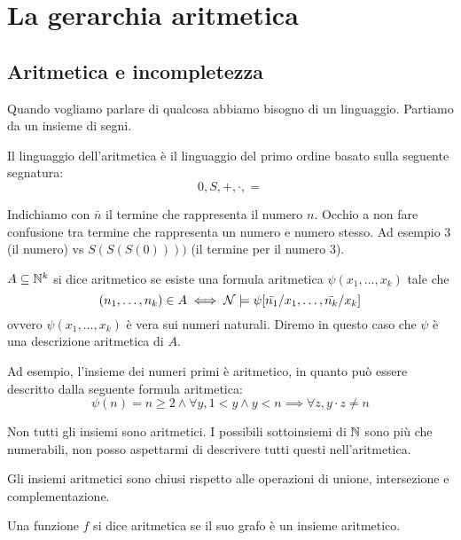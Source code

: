 \chapter{La gerarchia aritmetica}

\section{Aritmetica e incompletezza}

Quando vogliamo parlare di qualcosa abbiamo bisogno di un linguaggio. Partiamo da un insieme di
segni.

Il linguaggio dell'aritmetica è il linguaggio del primo ordine basato sulla
seguente segnatura:
\begin{equation*}
    0,S,+,\cdot,=
\end{equation*}

Indichiamo con $\bar{n}$ il termine che rappresenta il numero $n$. Occhio a non fare confusione tra
termine che rappresenta un numero e numero stesso. Ad esempio 3 (il numero) vs $S(S(S(0))))$ (il
termine per il numero 3).

\begin{defn}
    $A \subseteq \mathbb{N}^{k}$ si dice aritmetico se esiste una formula aritmetica
    $\psi(x_{1},\dotsc,x_{k})$ tale che
    \begin{equation*}
        (n_{1},\dotsc,n_{k}) \in A \iff \mathcal{N} \models \psi[\bar{n_{1}}/x_{1},\dotsc,\bar{n_{k}}/x_{k}]
    \end{equation*}
    ovvero $\psi(x_{1},\dotsc,x_{k})$ è vera sui numeri naturali. Diremo in questo caso che $\psi$ è una
    descrizione aritmetica di $A$.
\end{defn}

Ad esempio, l'insieme dei numeri primi è aritmetico, in quanto può essere
descritto dalla seguente formula aritmetica:
\begin{equation*}
    \psi(n) = n \geq 2 \land \forall y, 1 < y \land y < n \implies \forall z, y \cdot z \not= n
\end{equation*}

Non tutti gli insiemi sono aritmetici. I possibili sottoinsiemi di $\mathbb{N}$ sono più che numerabili,
non posso aspettarmi di descrivere tutti questi nell'aritmetica.

Gli insiemi aritmetici sono chiusi rispetto alle operazioni di unione, intersezione
e complementazione.

\begin{defn}
    Una funzione $f$ si dice aritmetica se il suo grafo è un insieme aritmetico.
\end{defn}

